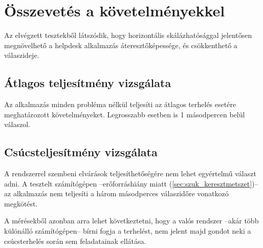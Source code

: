\pagebreak

\section{Összevetés a követelményekkel}
Az elvégzett tesztekből látszódik, hogy horizontális skálázhatósággal jelentősen megnövelhető a helpdesk alkalmazás áteresztőképessége, és csökkenthető a válaszideje.

\subsection{Átlagos teljesítmény vizsgálata}
Az alkalmazás minden probléma nélkül teljesíti az átlagos terhelés esetére meghatározott követelményeket. Legrosszabb esetben is 1 másodpercen belül válaszol.

\subsection{Csúcsteljesítmény vizsgálata}
A rendszerrel szembeni elvárások teljesíthetőségére nem lehet egyértelmű választ adni. A tesztelt számítógépen --erőforráshiány miatt (\ref{sec:szuk_keresztmetszet})-- az alkalmazás nem teljesíti a három másodperces válaszidőre vonatkozó megkötést.

A mérésekből azonban arra lehet következtetni, hogy a valós rendszer --akár több különálló számítógépen-- bírni fogja a terhelést, nem jelent majd gondot neki a csúcsterhelés során sem feladatainak ellátása.



